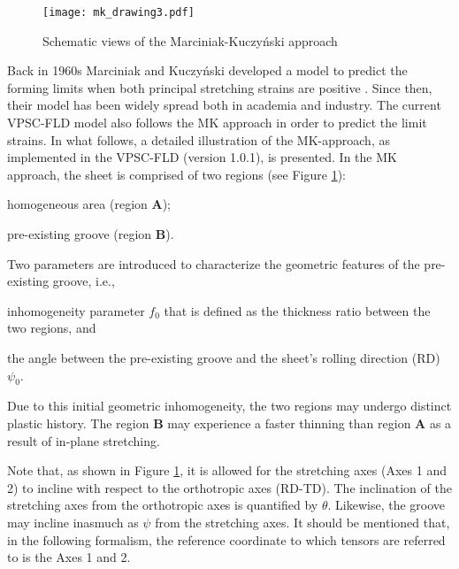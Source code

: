 \documentclass[12pt]{amsart}
\begin{document}
\begin{figure}
  \texttt{[image: mk\_drawing3.pdf]}
  \caption{Schematic views of the Marciniak-Kuczy\'{n}ski approach}
  \label{fig:mk}
\end{figure}
Back in 1960s Marciniak and Kuczy{\'n}ski developed a model to predict the forming limits when both principal stretching strains are positive \cite{Marciniak1967609}.
Since then, their model has been widely spread both in academia and industry.
The current VPSC-FLD model also follows the MK approach in order to predict the limit strains.
In what follows, a detailed illustration of the MK-approach, as implemented in the VPSC-FLD (version 1.0.1), is presented.
\newline
In the MK approach, the sheet is comprised of two regions (see Figure \ref{fig:mk}):
\begin{inparaenum}
\item homogeneous area (region \textbf{A});
\item pre-existing groove (region \textbf{B}).
\end{inparaenum}
Two parameters are introduced to characterize the geometric features of the pre-existing groove, i.e.,
\begin{inparaenum}
\item inhomogeneity parameter $f_0$ that is defined as the thickness ratio between the two regions, and
\item the angle between the pre-existing groove and the sheet's rolling direction (RD) $\psi_0$.
\end{inparaenum}
Due to this initial geometric inhomogeneity, the two regions may undergo distinct plastic history.
The region \textbf{B} may experience a faster thinning than region \textbf{A} as a result of in-plane stretching.


Note that, as shown in Figure \ref{fig:mk}, it is allowed for the stretching axes (Axes 1 and 2) to incline with respect to the orthotropic axes (RD-TD).
The inclination of the stretching axes from the orthotropic axes is quantified by $\theta$.
Likewise, the groove may incline inasmuch as $\psi$ from the stretching axes.
It should be mentioned that, in the following formalism, the reference coordinate to which tensors are referred to is the Axes 1 and 2.
\end{document}
